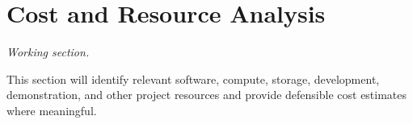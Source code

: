 \section{Cost and Resource Analysis}
\label{sec:costs}

\textit{Working section.}

This section will identify relevant software, compute, storage, development,
demonstration, and other project resources and provide defensible cost estimates
where meaningful.
